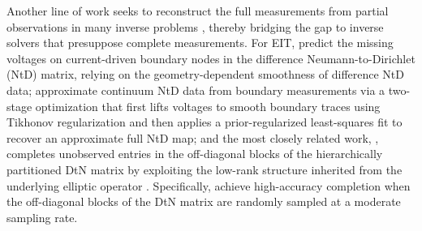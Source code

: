 \documentclass{article}
\begin{document}
Another line of work seeks to reconstruct the full measurements from partial observations in many inverse problems \citep{harrach2015interpolation, hauptmann2017approximation,caubet2019new,dou2022data,bui2022bridging}, thereby bridging the gap to inverse solvers that presuppose complete measurements. For EIT, \citet{harrach2015interpolation} predict the missing voltages on current-driven boundary nodes in the difference Neumann-to-Dirichlet (NtD) matrix, relying on the geometry-dependent smoothness of difference NtD data; \citet{hauptmann2017approximation} approximate continuum NtD data from boundary measurements via a two-stage optimization that first lifts voltages to smooth boundary traces using Tikhonov regularization and then applies a prior-regularized least-squares fit to recover an approximate full NtD map; and the most closely related work, \citet{bui2022bridging}, completes unobserved entries in the off-diagonal blocks of the hierarchically partitioned DtN matrix by exploiting the low-rank structure inherited from the underlying elliptic operator \citep{bebendorf2003existence}. Specifically, \citet{bui2022bridging} achieve high-accuracy completion when the off-diagonal blocks of the DtN matrix are randomly sampled at a moderate sampling rate. 
\end{document}
